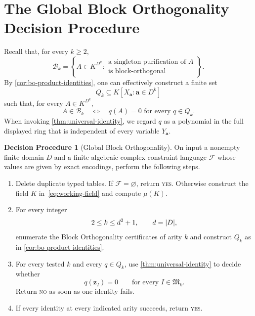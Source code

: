 \documentclass[11pt]{article}
\theoremstyle{plain}
\theoremstyle{definition}
\newtheorem{procedure}[procedure]{Decision Procedure}
\theoremstyle{remark}
\newcommand{\cF}{\mathcal F}
\newcommand{\zvec}[1]{\mathbf z_{#1}}
\newcommand{\InstMonoid}[1]{\mathfrak M_{#1}}
\newcommand{\YES}{\textnormal{\textsc{yes}}}
\newcommand{\NO}{\textnormal{\textsc{no}}}
\DeclarePairedDelimiter{\abs}{\lvert}{\rvert}
\begin{document}
\section{The Global Block Orthogonality Decision Procedure}
\label{sec:bo-algorithm}

Recall that, for every $k\ge2$,
\[
  \mathcal B_k
  =\left\{A\in K^{D^k}:
    \begin{array}{l}
      \text{a singleton purification of $A$}\\
      \text{is block-orthogonal}
    \end{array}
  \right\}.
\]
By \cref{cor:bo-product-identities}, one can effectively construct a finite
set
\[
  Q_k\subseteq K[X_{\mathbf a}:\mathbf a\in D^k]
\]
such that, for every $A\in K^{D^k}$,
\begin{equation}
  A\in\mathcal B_k
  \quad\Longleftrightarrow\quad
  q(A)=0\text{ for every }q\in Q_k.
  \label{eq:bo-algorithm-membership}
\end{equation}
When invoking \cref{thm:universal-identity}, we regard $q$ as a polynomial in
the full displayed ring that is independent of every variable
$Y_{\mathbf a}$.

\begin{procedure}[Global Block Orthogonality]
\label{proc:global-bo}
On input a nonempty finite domain $D$ and a finite algebraic-complex
constraint language $\cF$ whose values are given by exact encodings, perform
the following steps.
\begin{enumerate}
  \item Delete duplicate typed tables.  If $\cF=\varnothing$, return
        \YES.  Otherwise construct the field $K$
        in~\eqref{eq:working-field} and compute $\mu(K)$.
  \item For every integer
        \[
          2\le k\le d^2+1,
          \qquad d=\abs D,
        \]
        enumerate the Block Orthogonality certificates of arity $k$ and
        construct $Q_k$ as in \cref{cor:bo-product-identities}.
  \item For every tested $k$ and every $q\in Q_k$, use
        \cref{thm:universal-identity} to decide whether
        \[
          q(\zvec I)=0
          \qquad\text{for every }I\in\InstMonoid{k}.
        \]
        Return \NO{} as soon as one identity fails.
  \item If every identity at every indicated arity succeeds, return
        \YES.
\end{enumerate}
\end{procedure}
\end{document}

